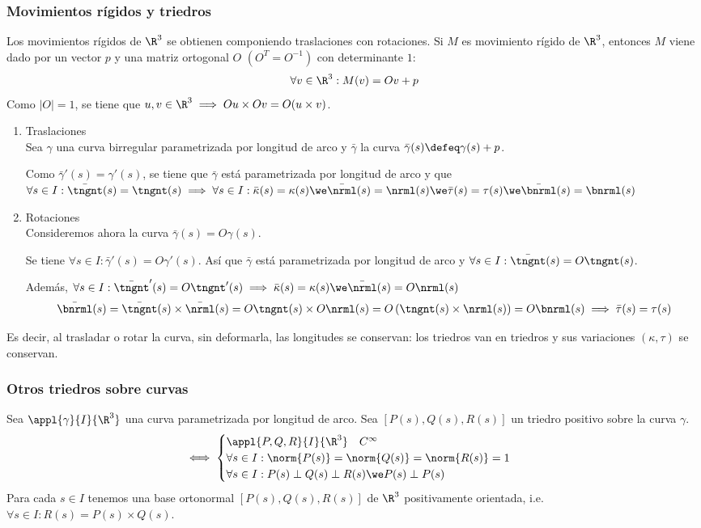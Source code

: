 \subsubsection{Movimientos rígidos y triedros}
Los movimientos rígidos de $\R^3$ se obtienen componiendo traslaciones con rotaciones. Si $M$ es movimiento rígido de $\R^3$, entonces $M$ viene dado por un vector $p$ y una matriz ortogonal $O$ $\left(O^T=O^{-1}\right)$ con determinante $1$:
\[\forall v \in \R^3 : M(v)=Ov+p\]
Como $|O|=1$, se tiene que $u, v \in \R^3 \implies Ou\times Ov=O(u\times v)$.
\begin{enumerate}
	\item Traslaciones \\
	Sea $\gamma$ una curva birregular parametrizada por longitud de arco y $\bar{\gamma}$ la curva $\bar{\gamma}(s)\defeq\gamma(s)+p$.

	Como $\bar{\gamma}'(s)=\gamma'(s)$, se tiene que $\bar{\gamma}$ está parametrizada por longitud de arco y que $\forall s \in I : \bar{\tngnt}(s) = \tngnt(s) \implies \forall s \in I : \bar{\kappa}(s)=\kappa(s) \we \bar{\nrml}(s)=\nrml(s) \we \bar{\tau}(s)=\tau(s) \we \bar{\bnrml}(s)=\bnrml(s)$
	\item Rotaciones \\
	Consideremos ahora la curva $\bar{\gamma}(s)=O\gamma(s)$.

	Se tiene $\forall s \in I : \bar{\gamma}'(s)=O\gamma'(s)$. Así que $\bar{\gamma}$ está parametrizada por longitud de arco y $\forall s \in I : \bar{\tngnt}(s)=O\tngnt(s)$.

	Además, $\forall s \in I : \bar{\tngnt}'(s)=O\tngnt'(s) \implies \bar{\kappa}(s)=\kappa(s) \we \bar{\nrml}(s)=O\nrml(s)$
	\[\bar{\bnrml}(s)=\bar{\tngnt}(s)\times\bar{\nrml}(s) = O\tngnt(s)\times O\nrml(s)=O\left(\tngnt(s)\times \nrml(s)\right)=O\bnrml(s) \implies \bar{\tau}(s)=\tau(s)\]
\end{enumerate}
Es decir, al trasladar o rotar la curva, sin deformarla, las longitudes se conservan: los triedros van en triedros y sus variaciones $(\kappa, \tau)$ se conservan.

\subsubsection{Otros triedros sobre curvas}
Sea $\appl{\gamma}{I}{\R^3}$ una curva parametrizada por longitud de arco. Sea $\left[P(s), Q(s), R(s)\right]$ un triedro positivo sobre la curva $\gamma$.
\[\iff \begin{cases}
	\appl{P, Q, R}{I}{\R^3} \quad C^\infty \\
	\forall s \in I : \norm{P(s)}=\norm{Q(s)}=\norm{R(s)}=1 \\
	\forall s \in I : P(s) \perp Q(s) \perp R(s) \we P(s) \perp P(s)
\end{cases}\]
Para cada $s \in I$ tenemos una base ortonormal $[P(s), Q(s), R(s)]$ de $\R^3$ positivamente orientada, i.e. $\forall s \in I : R(s)=P(s)\times Q(s)$.

